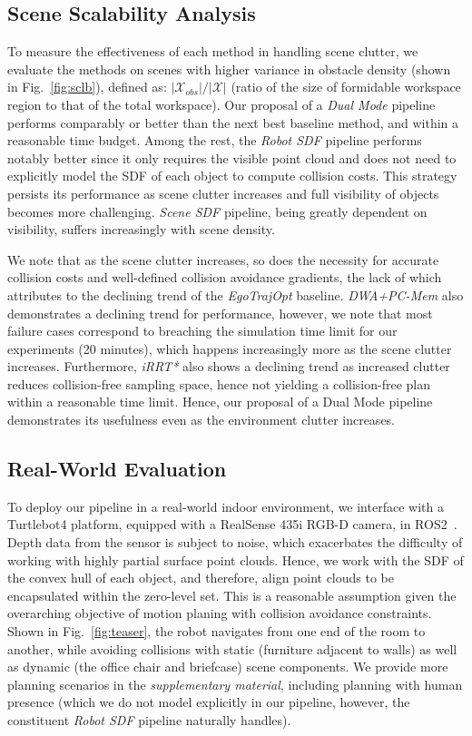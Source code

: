 \documentclass[letterpaper, 10 pt, conference]{ieeeconf}  %
\begin{document}
\subsection{Scene Scalability Analysis}


To measure the effectiveness of each method in handling scene clutter, we evaluate the methods on scenes with higher variance in obstacle density (shown in Fig.~\ref{fig:sclb}), defined as: $|\mathcal{X}_{obs}| / |\mathcal{X}|$ (ratio of the size of formidable workspace region to that of the total workspace).
Our proposal of a \emph{Dual Mode} pipeline performs comparably or better than the next best baseline method, and within a reasonable time budget.
Among the rest, the \emph{Robot SDF} pipeline performs notably better since it only requires the visible point cloud and does not need to explicitly model the SDF of each object to compute collision costs.
This strategy persists its performance as scene clutter increases and full visibility of objects becomes more challenging.
\emph{Scene SDF} pipeline, being greatly dependent on visibility, suffers increasingly with scene density.

We note that as the scene clutter increases, so does the necessity for accurate collision costs and well-defined collision avoidance gradients, the lack of which attributes to the declining trend of the \emph{EgoTrajOpt} baseline.
\emph{DWA+PC-Mem} also demonstrates a declining trend for performance, however, we note that most failure cases correspond to breaching the simulation time limit for our experiments (20 minutes), which happens increasingly more as the scene clutter increases.
Furthermore, \emph{iRRT*} also shows a declining trend as increased clutter reduces collision-free sampling space, hence not yielding a collision-free plan within a reasonable time limit.
Hence, our proposal of a Dual Mode pipeline demonstrates its usefulness even as the environment clutter increases.

\subsection{Real-World Evaluation}

To deploy our pipeline in a real-world indoor environment, we interface with a Turtlebot4 platform, equipped with a RealSense 435i RGB-D camera, in ROS2~\cite{ros2}.
Depth data from the sensor is subject to noise, which exacerbates the difficulty of working with highly partial surface point clouds.
Hence, we work with the SDF of the convex hull of each object, and therefore, align point clouds to be encapsulated within the zero-level set.
This is a reasonable assumption given the overarching objective of motion planing with collision avoidance constraints.
Shown in Fig.~\ref{fig:teaser}, the robot navigates from one end of the room to another, while avoiding collisions with static (furniture adjacent to walls) as well as dynamic (the office chair and briefcase) scene components.
We provide more planning scenarios in the \emph{supplementary material}, including planning with human presence (which we do not model explicitly in our pipeline, however, the constituent \emph{Robot SDF} pipeline naturally handles).
\end{document}
